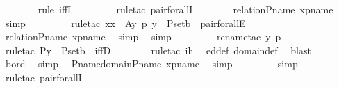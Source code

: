 \begin{isabellebody}
\ \ \ \ \ \ \isamarkupfalse%
\ {\isacharparenleft}{\kern0pt}rule\ iffI{\isacharparenright}{\kern0pt}\ \isanewline
\ \ \ \ \ \ \isamarkupfalse%
\ {\isacharparenleft}{\kern0pt}rule{\isacharunderscore}{\kern0pt}tac\ pair{\isacharunderscore}{\kern0pt}forallI{\isacharparenright}{\kern0pt}\isanewline
\ \ \ \ \ \ \isamarkupfalse%
\ relation{\isacharunderscore}{\kern0pt}P{\isacharunderscore}{\kern0pt}name\ xpname\ \isamarkupfalse%
\ simp\ \isanewline
\ \ \ \ \ \ \isamarkupfalse%
\ {\isacharparenleft}{\kern0pt}rule{\isacharunderscore}{\kern0pt}tac\ x{\isacharequal}{\kern0pt}x\ \ A{\isacharequal}{\kern0pt}{\isachardoublequoteopen}{\isasymlambda}y\ p{\isachardot}{\kern0pt}\ y\ {\isasymin}\ P{\isacharunderscore}{\kern0pt}set{\isacharparenleft}{\kern0pt}b{\isacharparenright}{\kern0pt}{\isachardoublequoteclose}\ \ pair{\isacharunderscore}{\kern0pt}forallE{\isacharparenright}{\kern0pt}\isanewline
\ \ \ \ \ \ \isamarkupfalse%
\ relation{\isacharunderscore}{\kern0pt}P{\isacharunderscore}{\kern0pt}name\ xpname\ \isamarkupfalse%
\ simp\ \isamarkupfalse%
\ simp\ \isanewline
\ \ \ \ \ \ \isamarkupfalse%
\ {\isacharparenleft}{\kern0pt}rename{\isacharunderscore}{\kern0pt}tac\ y\ p{\isacharparenright}{\kern0pt}\isanewline
\ \ \ \ \ \ \isamarkupfalse%
\ {\isacharparenleft}{\kern0pt}rule{\isacharunderscore}{\kern0pt}tac\ P{\isacharequal}{\kern0pt}{\isachardoublequoteopen}y\ {\isasymin}\ P{\isacharunderscore}{\kern0pt}set{\isacharparenleft}{\kern0pt}b{\isacharparenright}{\kern0pt}{\isachardoublequoteclose}\ \ iffD{}{\isacharparenright}{\kern0pt}\isanewline
\ \ \ \ \ \ \isamarkupfalse%
\ {\isacharparenleft}{\kern0pt}rule{\isacharunderscore}{\kern0pt}tac\ ih{\isacharparenright}{\kern0pt}\ \isamarkupfalse%
\ ed{\isacharunderscore}{\kern0pt}def\ domain{\isacharunderscore}{\kern0pt}def\ \isamarkupfalse%
\ blast\ \isanewline
\ \ \ \ \ \ \isamarkupfalse%
\ bord\ \isamarkupfalse%
\ simp\ \isamarkupfalse%
\ P{\isacharunderscore}{\kern0pt}name{\isacharunderscore}{\kern0pt}domain{\isacharunderscore}{\kern0pt}P{\isacharunderscore}{\kern0pt}name\ xpname\ \isamarkupfalse%
\ simp\ \isanewline
\ \ \ \ \ \ \isamarkupfalse%
\ simp\ \isanewline
\ \ \ \ \ \ \isamarkupfalse%
\ {\isacharparenleft}{\kern0pt}rule{\isacharunderscore}{\kern0pt}tac\ pair{\isacharunderscore}{\kern0pt}forallI{\isacharparenright}{\kern0pt}\isanewline

\end{isabellebody}
